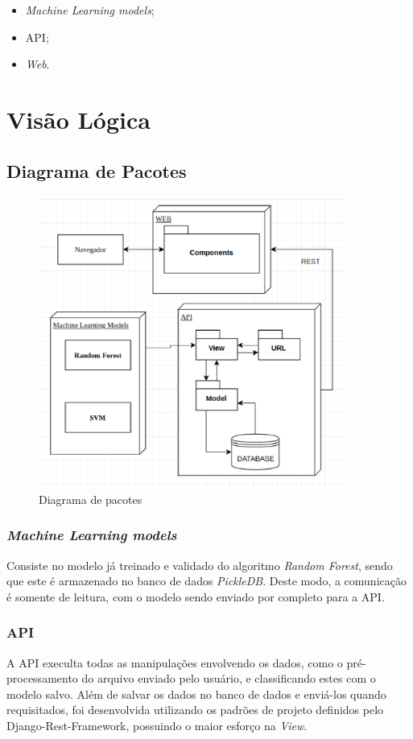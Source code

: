 \begin{anexosenv}
    \begin{itemize}
        \item \textit{Machine Learning models};
        \item API;
        \item \textit{Web}.
    \end{itemize}


   \section{Visão Lógica}
   \subsection{Diagrama de Pacotes}
   \begin{figure}[!htb]
        \centering
        \includegraphics[width=0.9\textwidth]{figuras/diagrama_pacotes.eps}
        \caption{Diagrama de pacotes}
        \label{diagramadepacotes}
    \end{figure}
    \subsubsection{\textit{Machine Learning models}}
    Consiste no modelo já treinado e validado do algoritmo \textit{Random Forest}, sendo que este é armazenado no banco de dados \textit{PickleDB}. Deste modo, a comunicação é somente de leitura, com o modelo sendo enviado por completo para a API.

    \subsubsection{API}
    A API execulta todas as manipulações envolvendo os dados, como o pré-processamento do arquivo enviado pelo usuário, e classificando estes com o modelo salvo. Além de salvar os dados no banco de dados e enviá-los quando requisitados, foi desenvolvida utilizando os padrões de projeto definidos pelo Django-Rest-Framework, possuindo o maior esforço na \textit{View}.


\end{anexosenv}
